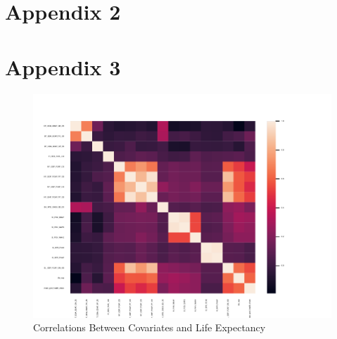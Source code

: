 \documentclass[12pt]{article}
\begin{document}
    \section*{Appendix 2}


        
        
        
        


    \section*{Appendix 3}

        \begin{figure}[h!]
            \centering
            \caption{Correlations Between Covariates and Life Expectancy}
            \label{LE_Health_Econ_Correlations}	
            \includegraphics[width=\linewidth,keepaspectratio=true]{../Output/Figures/LE_Health_Econ_Correlations.pdf}
        \end{figure}
\end{document}

